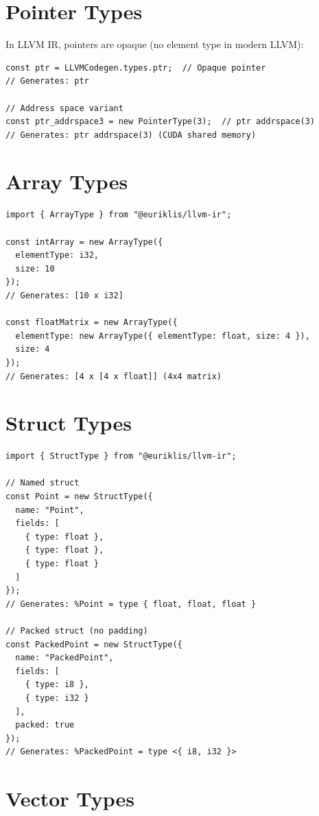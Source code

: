 \documentclass[11pt,oneside]{book}
\begin{document}
\section{Pointer Types}

In LLVM IR, pointers are opaque (no element type in modern LLVM):

\begin{lstlisting}[style=ts]
const ptr = LLVMCodegen.types.ptr;  // Opaque pointer
// Generates: ptr

// Address space variant
const ptr_addrspace3 = new PointerType(3);  // ptr addrspace(3)
// Generates: ptr addrspace(3) (CUDA shared memory)
\end{lstlisting}

\section{Array Types}

\begin{lstlisting}[style=ts]
import { ArrayType } from "@euriklis/llvm-ir";

const intArray = new ArrayType({
  elementType: i32,
  size: 10
});
// Generates: [10 x i32]

const floatMatrix = new ArrayType({
  elementType: new ArrayType({ elementType: float, size: 4 }),
  size: 4
});
// Generates: [4 x [4 x float]] (4x4 matrix)
\end{lstlisting}

\section{Struct Types}

\begin{lstlisting}[style=ts]
import { StructType } from "@euriklis/llvm-ir";

// Named struct
const Point = new StructType({
  name: "Point",
  fields: [
    { type: float },
    { type: float },
    { type: float }
  ]
});
// Generates: %Point = type { float, float, float }

// Packed struct (no padding)
const PackedPoint = new StructType({
  name: "PackedPoint",
  fields: [
    { type: i8 },
    { type: i32 }
  ],
  packed: true
});
// Generates: %PackedPoint = type <{ i8, i32 }>
\end{lstlisting}

\section{Vector Types}
\end{document}
